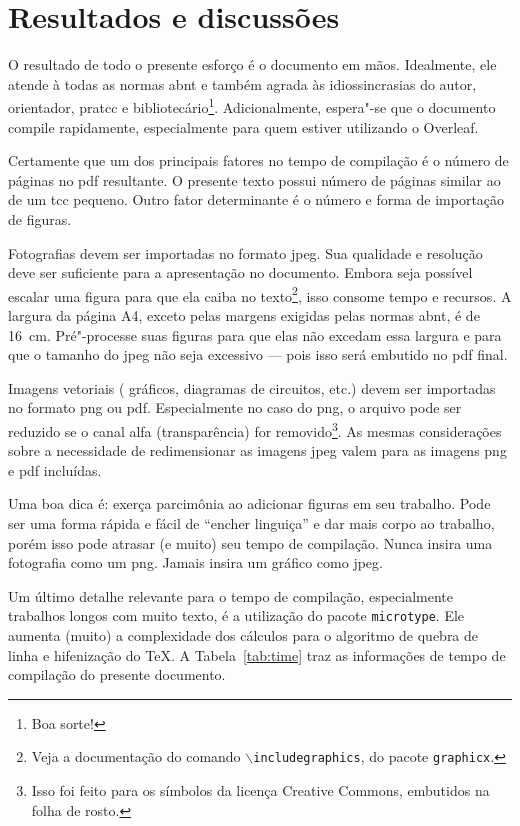 \chapter{Resultados e discussões}\label{cap:resultados}

O resultado de todo o presente esforço é o documento em mãos. Idealmente, ele atende à todas as normas \ac{abnt} e também agrada às idiossincrasias do autor, orientador, \ac{pratcc} e bibliotecário\footnote{Boa sorte!}. Adicionalmente, espera"-se que o documento compile rapidamente, especialmente para quem estiver utilizando o Overleaf.

Certamente que um dos principais fatores no tempo de compilação é o número de páginas no \ac{pdf} resultante. O presente texto possui número de páginas similar ao de um \ac{tcc} pequeno. Outro fator determinante é o número e forma de importação de figuras.

Fotografias devem ser importadas no formato \ac{jpeg}. Sua qualidade e resolução deve ser suficiente para a apresentação no documento. Embora seja possível escalar uma figura para que ela caiba no texto\footnote{Veja a documentação do comando \texttt{$\backslash$includegraphics}, do pacote \texttt{graphicx}.}, isso consome tempo e recursos. A largura da página A4, exceto pelas margens exigidas pelas normas \ac{abnt}, é de 16~cm. Pré"-processe suas figuras para que elas não excedam essa largura e para que o tamanho do \ac{jpeg} não seja excessivo --- pois isso será embutido no \ac{pdf} final.

Imagens vetoriais ( gráficos, diagramas de circuitos, etc.) devem ser importadas no formato \ac{png} ou \ac{pdf}. Especialmente no caso do \ac{png}, o arquivo pode ser reduzido se o canal alfa (transparência) for removido\footnote{Isso foi feito para os símbolos da licença Creative Commons, embutidos na folha de rosto.}. As mesmas considerações sobre a necessidade de redimensionar as imagens \ac{jpeg} valem para as imagens \ac{png} e \ac{pdf} incluídas.

Uma boa dica é: exerça parcimônia ao adicionar figuras em seu trabalho. Pode ser uma forma rápida e fácil de \enquote{encher linguiça} e dar mais corpo ao trabalho, porém isso pode atrasar (e muito) seu tempo de compilação. Nunca insira uma fotografia como um \ac{png}. Jamais insira um gráfico como \ac{jpeg}.

Um último detalhe relevante para o tempo de compilação, especialmente trabalhos longos com muito texto, é a utilização do pacote \texttt{microtype}. Ele aumenta (muito) a complexidade dos cálculos para o algoritmo de quebra de linha e hifenização do \TeX. A Tabela~\ref{tab:time} traz as informações de tempo de compilação do presente documento.

